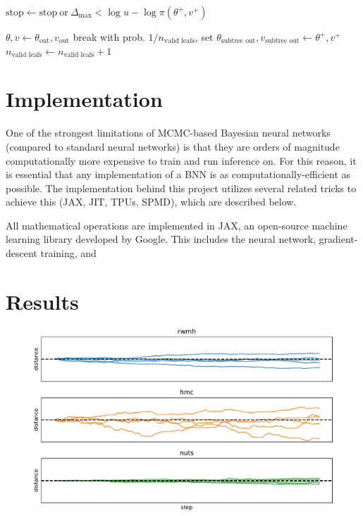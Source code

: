 \documentclass[12pt]{article}
\begin{document}
\begin{algorithm}
\begin{algorithmic}
		\State $\textrm{stop} \gets \textrm{stop} \ \textrm{or} \ \Delta_\mathrm{max} < \log u - \log \pi(\theta^+, v^+)$ 
			
			\State $\theta, v \gets \theta_\textrm{out}, v_\textrm{out}$ 
			\State break
		\Else
			 
				\State with prob. $1/n_\textrm{valid leafs}$, set $\theta_\textrm{subtree out}, v_\textrm{subtree out} \gets \theta^+, v^+$ 
				\State $n_\textrm{valid leafs} \gets n_\textrm{valid leafs} + 1$
			\EndIf
		\EndIf
		
	\EndFor
\EndFor
\end{algorithmic}
\end{algorithm}

\section{Implementation}

One of the strongest limitations of MCMC-based Bayesian neural networks (compared to standard neural networks) is that they are orders of magnitude computationally more expensive to train and run inference on. For this reason, it is essential that any implementation of a BNN is as computationally-efficient as possible. The implementation behind this project utilizes several related tricks to achieve this (JAX, JIT, TPUs, SPMD), which are described below.

All mathematical operations are implemented in JAX, an open-source machine learning library developed by Google. This includes the neural network, gradient-descent training, and 

\section{Results}

\begin{figure}[h]
\centering
\includegraphics[width=16cm]{plots/uci_param_history.pdf}
\caption{}
\label{fig_uci_param_history}
\end{figure}
\end{document}
